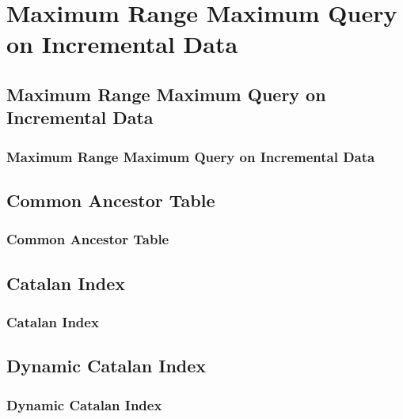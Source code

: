 \section{Maximum Range Maximum Query on Incremental Data}

\subsection{Maximum Range Maximum Query on Incremental Data}
\begin{frame}
    \frametitle{Maximum Range Maximum Query on Incremental Data}
\end{frame}

\subsection{Common Ancestor Table}
\begin{frame}
    \frametitle{Common Ancestor Table}
\end{frame}

\subsection{Catalan Index}
\begin{frame}
    \frametitle{Catalan Index}
\end{frame}

\subsection{Dynamic Catalan Index}
\begin{frame}
    \frametitle{Dynamic Catalan Index}
\end{frame}